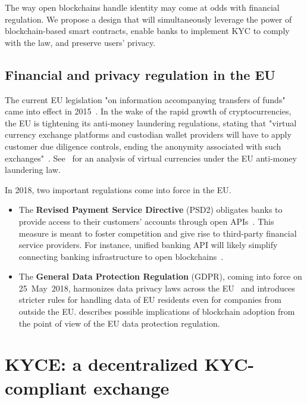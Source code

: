 The way open blockchains handle identity may come at odds with financial regulation.
We propose a design that will simultaneously leverage the power of blockchain-based smart contracts, enable banks to implement KYC to comply with the law, and preserve users' privacy.


\subsection{Financial and privacy regulation in the EU} \label{sec:Ch12KYCEU}

The current EU legislation "on information accompanying transfers of funds" came into effect in 2015~\cite{EU847}.
In the wake of the rapid growth of cryptocurrencies, the EU is tightening its anti-money laundering regulations, stating that "virtual currency exchange platforms and custodian wallet providers will have to apply customer due diligence controls, ending the anonymity associated with such exchanges"~\cite{EU16}.
See~\cite{Vandezande2017} for an analysis of virtual currencies under the EU anti-money laundering law.

In 2018, two important regulations come into force in the EU.

\begin{itemize}
	\item The \textbf{Revised Payment Service Directive} (PSD2) obligates banks to provide access to their customers' accounts through open APIs~\cite{Hellstroem2017}.
	This measure is meant to foster competition and give rise to third-party financial service providers.
	For instance, unified banking API will likely simplify connecting banking infrastructure to open blockchains~\cite{Elison2016}.
	\item The \textbf{General Data Protection Regulation} (GDPR), coming into force on 25~May~2018, harmonizes data privacy laws across the EU~\cite{GDPR16} and introduces stricter rules for handling data of EU residents even for companies from outside the EU.
	\cite{Berberich2016} describes possible implications of blockchain adoption from the point of view of the EU data protection regulation.
\end{itemize}




\section{KYCE: a decentralized KYC-compliant exchange}

